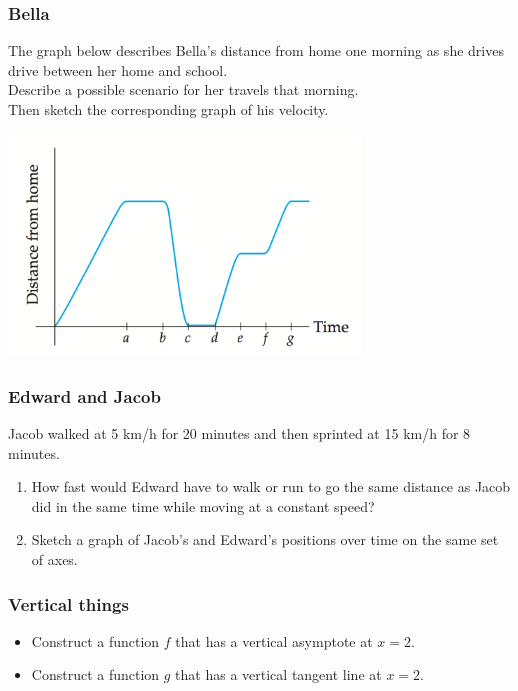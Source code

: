 \documentclass[14pt]{beamer}
\newcommand{\azul}[1]{{\color{blue} #1}}
\newcommand{\rojo}[1]{{\color{red} #1}}
\begin{document}
\begin{frame}
\frametitle{Bella}

The graph below describes Bella's distance from home one morning as she drives drive between her home and school.\\

Describe a possible scenario for her travels that morning. \\
Then sketch the corresponding graph of his velocity.

\begin{center}
\includegraphics[width=0.7\textwidth]{G9}
\end{center}

\end{frame}

\begin{frame}
\frametitle{Edward and Jacob}

Jacob walked at 5 km/h for 20 minutes and then sprinted at 15 km/h for 8 minutes.
\begin{enumerate}
\item How fast would Edward have to walk or run to go the same distance as Jacob did in the same time while moving at a constant speed? 
\item Sketch a graph of Jacob's and Edward's positions over time on the same set of axes.
\end{enumerate}

\end{frame}

\begin{frame}[t]
\frametitle{Vertical things}

\begin{itemize}
	\item Construct a function $f$ that has a \rojo{vertical asymptote} at $x=2$.
	\item Construct a function $g$ that has a \azul{vertical tangent line} at $x=2$.
\end{itemize}

\end{frame}
\end{document}
